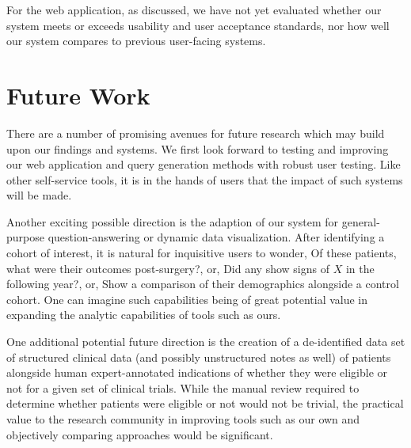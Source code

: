 \documentclass[../main.tex]{subfiles}
\begin{document}
For the web application, as discussed, we have not yet evaluated whether our system meets or exceeds usability and user acceptance standards, nor how well our system compares to previous user-facing systems. 

\section{Future Work}

There are a number of promising avenues for future research which may build upon our findings and systems. We first look forward to testing and improving our web application and query generation methods with robust user testing. Like other self-service tools, it is in the hands of users that the impact of such systems will be made.

Another exciting possible direction is the adaption of our system for general-purpose question-answering or dynamic data visualization. After identifying a cohort of interest, it is natural for inquisitive users to wonder, Of these patients, what were their outcomes post-surgery?, or, Did any show signs of $X$ in the following year?, or, Show a comparison of their demographics alongside a control cohort. One can imagine such capabilities being of great potential value in expanding the analytic capabilities of tools such as ours.

One additional potential future direction is the creation of a de-identified data set of structured clinical data (and possibly unstructured notes as well) of patients alongside human expert-annotated indications of whether they were eligible or not for a given set of clinical trials. While the manual review required to determine whether patients were eligible or not would not be trivial, the practical value to the research community in improving tools such as our own and objectively comparing approaches would be significant.
\end{document}

